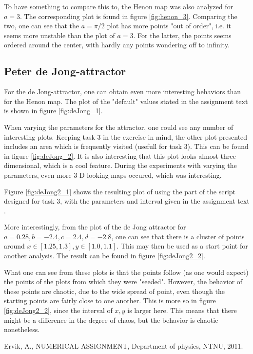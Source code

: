 \documentclass{article}
\begin{document}
To have something to compare this to, the Henon map was also analyzed for $a = 3$. The corresponding plot is found in figure \ref{fig:henon_3}. Comparing the two, one can see that the $a = \pi/2$ plot has more points "out of order", i.e. it seems more unstable than the plot of $a = 3$. For the latter, the points seems ordered around the center, with hardly any points wondering off to infinity.



\subsection{Peter de Jong-attractor}

For the de Jong-attractor, one can obtain even more interesting behaviors than for the Henon map. The plot of the "default" values stated in the assignment text is shown in figure \ref{fig:deJong_1}.


When varying the parameters for the attractor, one could see any number of interesting plots. Keeping task 3 in the exercise in mind, the other plot presented includes an area which is frequently visited (usefull for task 3). This can be found in figure \ref{fig:deJong_2}. It is also interesting that this plot looks almost three dimensional, which is a cool feature. During the experiments with varying the parameters, even more 3-D looking maps occured, which was interesting. 


Figure \ref{fig:deJong2_1} shows the resulting plot of using the part of the script designed for task 3, with the parameters and interval given in the assignment text \cite{ex_text}.


More interestingly, from the plot of the de Jong attractor for $a = 0.28, b = -2.4, c = 2.4, d = -2.8$, one can see that there is a cluster of points around   $ x \in [1.25,1.3], y \in [1.0,1.1]$. This may then be used as a start point for another analysis. The result can be found in figure \ref{fig:deJong2_2}. 


What one can see from these plots is that the points follow (as one would expect) the points of the plots from which they were "seeded". However, the behavior of these points are chaotic, due to the wide spread of point, even though the starting points are fairly close to one another. This is more so in figure \ref{fig:deJong2_2}, since the interval of $x,y$ is larger here. This means that there might be a difference in the degree of chaos, but the behavior is chaotic nonetheless.


\begin{thebibliography}{99}
Ervik, A., NUMERICAL ASSIGNMENT, Department of physics, NTNU, 2011.
\end{thebibliography}
\end{document}
